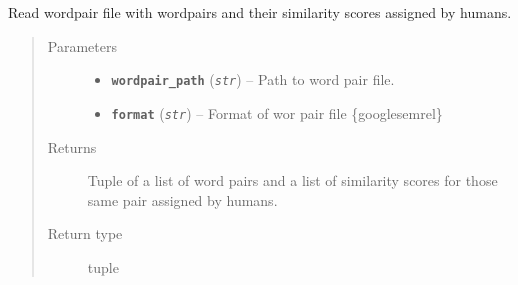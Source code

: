 \documentclass[letterpaper,10pt,english]{sphinxmanual}
\begin{document}

\begin{fulllineitems}
\label{src.eval:src.eval.word_similarity.read_wordpairs}
Read wordpair file with wordpairs and their similarity scores assigned by humans.
\begin{quote}\begin{description}
\item[{Parameters}] \leavevmode\begin{itemize}
\item {} 
\textbf{\texttt{wordpair\_path}} (\emph{\texttt{str}}) -- Path to word pair file.

\item {} 
\textbf{\texttt{format}} (\emph{\texttt{str}}) -- Format of wor pair file \{google\textbar{}semrel\}

\end{itemize}

\item[{Returns}] \leavevmode
Tuple of a list of word pairs and a list of similarity scores for those same pair assigned by humans.

\item[{Return type}] \leavevmode
tuple

\end{description}\end{quote}

\end{fulllineitems}

\end{document}
